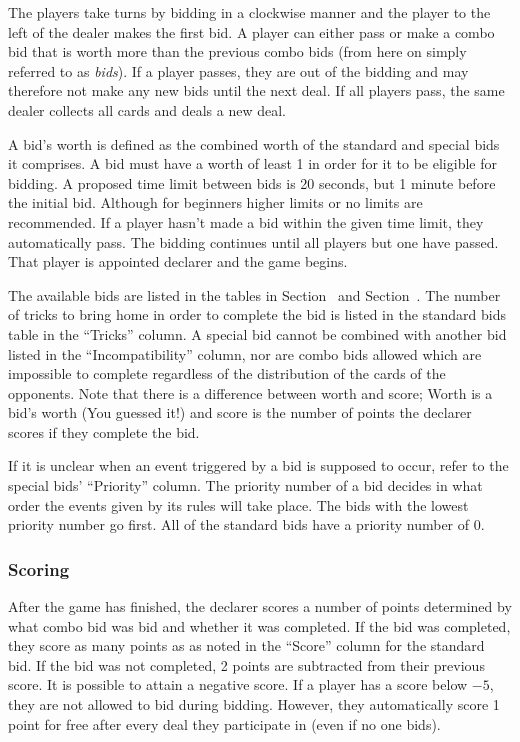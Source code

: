 \documentclass[a4paper]{article}
\begin{document}
				The players take turns by bidding in a clockwise manner and the player to the left of the dealer makes the first bid. A player can either pass or make a combo bid that is worth more than the previous combo bids (from here on simply referred to as \emph{bids}). If a player passes, they are out of the bidding and may therefore not make any new bids until the next deal. If all players pass, the same dealer collects all cards and deals a new deal.

				A bid's worth is defined as the combined worth of the standard and special bids it comprises. A bid must have a worth of least 1 in order for it to be eligible for bidding. A proposed time limit between bids is 20 seconds, but 1 minute before the initial bid. Although for beginners higher limits or no limits are recommended. If a player hasn't made a bid within the given time limit, they automatically pass. The bidding continues until all players but one have passed. That player is appointed declarer and the game begins.

				The available bids are listed in the tables in Section~ and Section~. The number of tricks to bring home in order to complete the bid is listed in the standard bids table in the ``Tricks'' column. A special bid cannot be combined with another bid listed in the ``Incompatibility'' column, nor are combo bids allowed which are impossible to complete regardless of the distribution of the cards of the opponents. Note that there is a difference between worth and score; Worth is a bid's worth (You guessed it!) and score is the number of points the declarer scores if they complete the bid.

				If it is unclear when an event triggered by a bid is supposed to occur, refer to the special bids' ``Priority'' column. The priority number of a bid decides in what order the events given by its rules will take place. The bids with the lowest priority number go first. All of the standard bids have a priority number of 0.

			\subsubsection{Scoring}
				After the game has finished, the declarer scores a number of points determined by what combo bid was bid and whether it was completed. If the bid was completed, they score as many points as as noted in the ``Score'' column for the standard bid. If the bid was not completed, 2 points are subtracted from their previous score. It is possible to attain a negative score. If a player has a score below $-5$, they are not allowed to bid during bidding. However, they automatically score 1 point for free after every deal they participate in (even if no one bids).
\end{document}
